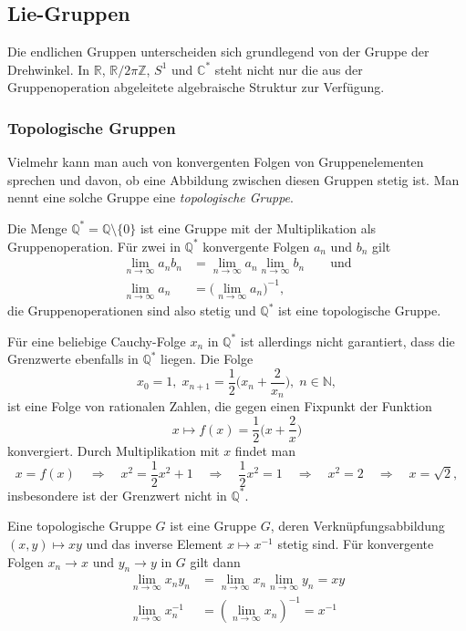 %
%
%

%
%
\subsection{Lie-Gruppen
\label{buch:gruppen:subsection:lie-gruppen}}
Die endlichen Gruppen unterscheiden sich grundlegend von der Gruppe
der Drehwinkel.
In $\mathbb{R}$, $\mathbb{R}/2\pi\mathbb{Z}$, $S^1$ und $\mathbb{C}^*$
steht nicht nur die aus der Gruppenoperation abgeleitete algebraische
Struktur zur Verfügung.

%
%
\subsubsection{Topologische Gruppen}
Vielmehr kann man auch von konvergenten Folgen von Gruppenelementen
sprechen und davon, ob eine Abbildung zwischen diesen Gruppen
stetig ist.
Man nennt eine solche Gruppe eine {\em topologische Gruppe}.
%

\begin{beispiel}
Die Menge
\(
\mathbb{Q}^*
=
\mathbb{Q} \setminus\{0\}
\)
ist eine Gruppe mit der Multiplikation als Gruppenoperation.
Für zwei in $\mathbb{Q}^*$ konvergente Folgen $a_n$ und $b_n$ gilt
\begin{align*}
\lim_{n\to\infty} a_nb_n
&=
\lim_{n\to\infty} a_n
\lim_{n\to\infty} b_n
\qquad\text{und}
\\
\lim_{n\to\infty} a_n
&=
\bigl(
\lim_{n\to\infty} a_n
\bigr)^{-1},
\end{align*}
die Gruppenoperationen sind also stetig und $\mathbb{Q}^*$
ist eine topologische Gruppe.

Für eine beliebige Cauchy-Folge $x_n$ in $\mathbb{Q}^*$
ist allerdings nicht garantiert, dass die Grenzwerte ebenfalls
in $\mathbb{Q}^*$ liegen.
Die Folge
\[
x_0=1,\;
x_{n+1} = \frac12\biggl(x_n+\frac{2}{x_n}\biggr),\; n\in\mathbb{N},
\]
ist eine Folge von rationalen Zahlen, die gegen einen Fixpunkt der
Funktion
\[
x\mapsto f(x)=\frac12\biggl(x+\frac{2}{x}\biggr)
\]
konvergiert.
Durch Multiplikation mit $x$ findet man
\[
x=f(x)
\quad\Rightarrow\quad
x^2=\frac12 x^2 + 1
\quad\Rightarrow\quad
\frac12x^2=1
\quad\Rightarrow\quad
x^2=2
\quad\Rightarrow\quad
x=\!\sqrt{2},
\]
insbesondere ist der Grenzwert nicht in $\mathbb{Q}^*$.
\end{beispiel}

\begin{definition}
\label{buch:gruppen:gruppe:def:topgruppe}
Eine topologische Gruppe $G$ ist eine Gruppe $G$, deren Verknüpfungsabbildung
$(x,y)\mapsto xy$ und das inverse Element $x\mapsto x^{-1}$ stetig sind.
Für konvergente Folgen $x_n\to x$ und $y_n\to y$ in $G$ gilt dann
\begin{align*}
\lim_{n\to \infty} x_ny_n &= \lim_{n\to\infty} x_n \lim_{n\to\infty} y_n = xy
\\
\lim_{n\to \infty} x_n^{-1} &= (\lim_{n\to\infty} x_n)^{-1} = x^{-1}
\end{align*}
\end{definition}

